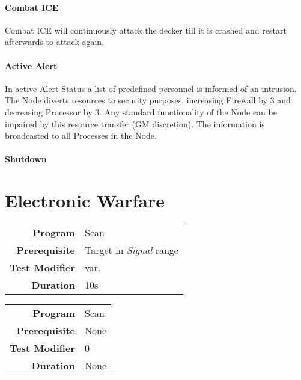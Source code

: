 \paragraph{Combat ICE} Combat ICE will continuously attack the decker till it
is crashed and restart afterwards to attack again.


\paragraph{Active Alert}

In active Alert Status a list of predefined personnel is informed of an intrusion.
The Node diverts resources to security purposes, increasing Firewall
by 3 and decreasing Processor by 3. Any standard functionality of the Node can
be impaired by this resource transfer (GM discretion).
The information is broadcasted to all Processes in the Node.

\paragraph{Shutdown}

\section{Electronic Warfare}

\label{par:find wireless}


\begin{tabular}{rl}
    \textbf{Program}       & Scan                          \\
    \textbf{Prerequisite}  & Target in \emph{Signal} range \\
    \textbf{Test Modifier} & var.                          \\
    \textbf{Duration}      & 10s                           \\
\end{tabular}

\hfill

\label{par:jam wireless}


\begin{tabular}{rl}
    \textbf{Program}       & Scan \\
    \textbf{Prerequisite}  & None \\
    \textbf{Test Modifier} & 0    \\
    \textbf{Duration}      & None \\
\end{tabular}

\hfill
